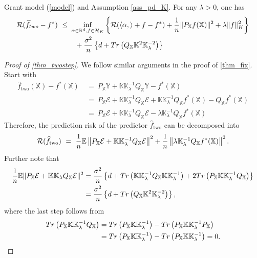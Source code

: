 \documentclass[10pt,a4paper]{amsart}
\def\EE{\mathbb{E}}
\def\KK{\mathbb{K}}
\def\RR{\mathbb{R}}
\def\XX{\mathbb{X}}
\def\YY{\mathbb{Y}}
\def\cE{\mathcal E}
\def\cH{\mathcal H}
\def\cR{\mathcal R}
\def\l{\left}
\def\r{\right}
\def\tr{{\rm Tr}}
\def\two{\text{two}}
\def\wh{\widehat}
\begin{document}
\begin{theorem}\label{thm_twostep}
    Grant model (\ref{model}) and
    Assumption   \ref{ass_pd_K}.  For any $\lambda >0$, one has 
    \begin{equation}
        \label{risk_bd_two}
        \begin{aligned}
      \cR(\wh f_{\rm two}-f^*) ~ \le ~    & \inf_{\alpha\in \RR^d, f\in \cH_K}\left\{  \cR(\langle \alpha,\rangle + f- f^*)  +  {1\over n} \|P_{\XX} f(\XX)\|^2+  \lambda \|f\|_K^2  \right\}\\
      & ~~ + {\sigma^2  \over n}\left\{ d +  \tr\l(Q_{\XX} \KK^2 \KK_{\lambda}^{-2} \r)\right\}
\end{aligned}
    \end{equation}
\end{theorem} 

\begin{proof}[Proof of \cref{thm_twostep}]
  We follow similar arguments in the proof of \cref{thm_fix}.   Start with
  \begin{align*}
 \wh f_{\two} (\XX) - f^*  (\XX ) 
&
~ =~ P_ \XX  \YY  +  \KK\KK_{\lambda} ^{-1} Q_{\XX} \YY -  f^*  (\XX) 
\\
&
~ =~ P_ \XX  \cE   +   \KK\KK_{\lambda} ^{-1} Q_{\XX} \cE +  \KK\KK_{\lambda}^{-1}   Q_{\XX}  f^*  (\XX)    - Q_{\XX} f^*  (\XX) \\
&
~ =~ P_ \XX  \cE   +   \KK\KK_{\lambda}^{-1}  Q_{\XX} \cE -  \lambda  \KK_{\lambda}^{-1} Q_{\XX}  f^*  (\XX) 
\end{align*}
Therefore, the prediction risk of the predictor $\wh f_{\two}$  can be decomposed into   
\[
\cR(\wh f_{\two}) ~ =~ 
 {1 \over n} \EE \l\| P_ \XX  \cE   +   \KK\KK_{\lambda} ^{-1}  Q_{\XX} \cE\r\| ^2 +  {1 \over n}\l \|  \lambda \KK_{\lambda}^{-1}  Q_{\XX}  f^*  (\XX)\r\|^2 .
\]
Further note that
\begin{equation}
    \label{decom_two}
    \begin{aligned}
 {1 \over n} \EE \| P_ \XX   \cE   + \KK\KK_{\lambda}  Q_{\XX} \cE\| ^2  
  & =   {\sigma^2  \over n} \left\{ d +    \tr\l(\KK\KK_{\lambda} ^{-1}Q_{\XX}  \KK\KK_{\lambda} ^{-1}\r) +2 \tr\l(P_{\XX}\KK\KK_{\lambda} ^{-1}Q_{\XX}  \r)\right\}
   \\
   & ={\sigma^2  \over n} \left\{ d +     \tr\l( Q_{\XX} \KK^2 \KK_{\lambda}^{-2} \r)  \right\}
   ,
\end{aligned}
\end{equation}
where  the last step follows from 
\begin{align*}
    \tr\l(P_{\XX} \KK \KK_{\lambda} ^{-1}Q_{\XX}  \r)     & =    \tr\l(P_{\XX}\KK\KK_{\lambda} ^{-1} \r)- \tr\l(P_{\XX}\KK\KK_{\lambda} ^{-1}  P_{\XX} \r) \\
    & = \tr\l(P_{\XX}\KK\KK_{\lambda} ^{-1} \r)- \tr\l(P_{\XX}\KK\KK_{\lambda} ^{-1} \r) = 0. 
\end{align*}


\end{proof}
\end{document}
